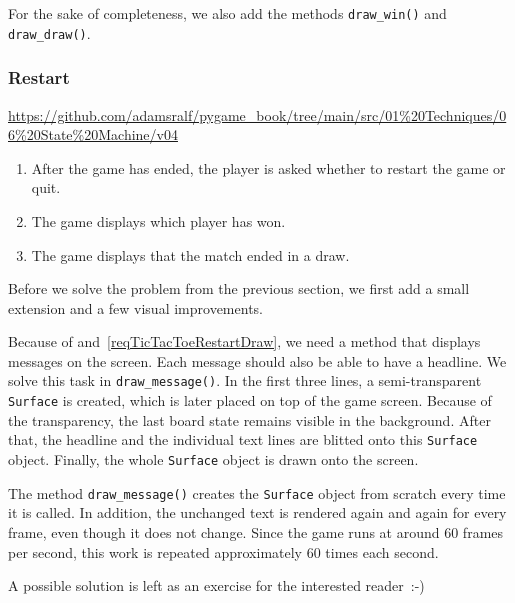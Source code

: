 For the sake of completeness, we also add the methods \texttt{draw\_win()} and \texttt{draw\_draw()}.



\subsubsection{Restart}
\begin{diskbox}
	\url{https://github.com/adamsralf/pygame_book/tree/main/src/01%20Techniques/06%20State%20Machine/v04}
\end{diskbox}

\begin{enumerate}
	\item After the game has ended, the player is asked whether to restart the game or quit.\label{reqTicTacToeRestartRestart}
	
	\item The game displays which player has won.\label{reqTicTacToeRestartWin}
	
	\item The game displays that the match ended in a draw.\label{reqTicTacToeRestartDraw}
\end{enumerate}
\er


Before we solve the problem from the previous section, we first add a small extension and a few visual improvements.

Because of  and~\ref{reqTicTacToeRestartDraw}, we need a method that displays messages on the screen. Each message should also be able to have a headline. We solve this task in \texttt{draw\_message()}. In the first three lines, a semi-transparent \texttt{Surface} is created, which is later placed on top of the game screen. Because of the transparency, the last board state remains visible in the background. After that, the headline and the individual text lines are blitted onto this \texttt{Surface} object. Finally, the whole \texttt{Surface} object is drawn onto the screen.


\begin{warningbox}
	
	The method \texttt{draw\_message()} creates the \texttt{Surface} object from scratch every time it is called. In addition, the unchanged text is rendered again and again for every frame, even though it does not change. Since the game runs at around 60 frames per second, this work is repeated approximately 60 times each second.
	
	A possible solution is left as an exercise for the interested reader~:-)
\end{warningbox}


